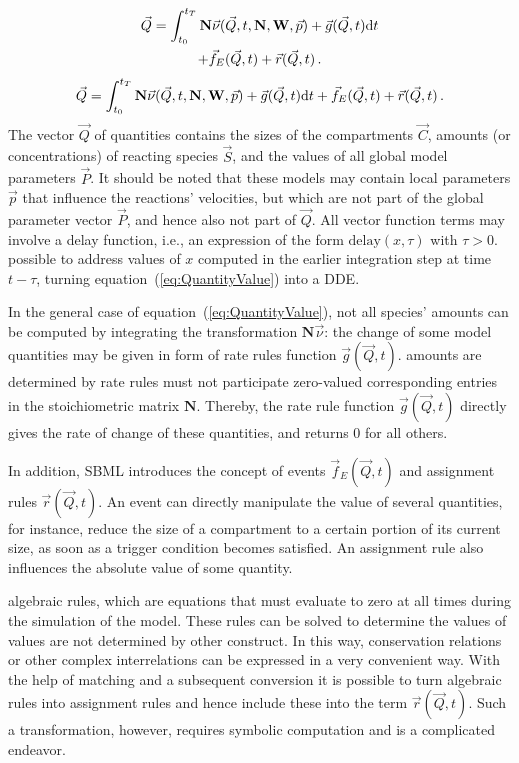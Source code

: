 \documentclass[10pt]{bmc_article}
\newenvironment{bmcformat}{\fussy\setboolean{publ}{true}}{\fussy}
\begin{document}
\begin{bmcformat}
{\begin{multline}
\vec{Q} = \int_{t_0}^{t_T} \mathbf{N}\vec{\nu}(\vec{Q}, t, \mathbf{N}, \mathbf{W},
\vec{p}) + \vec{g}(\vec{Q}, t)\mathrm{d} t\\ 
+ \vec{f}_E(\vec{Q}, t) + \vec{r}(\vec{Q}, t)\,.
\label{eq:QuantityValue}
\end{multline}}{\begin{equation}
\vec{Q} = \int_{t_0}^{t_T} \mathbf{N}\vec{\nu}(\vec{Q}, t, \mathbf{N}, \mathbf{W},
\vec{p}) + \vec{g}(\vec{Q}, t)\mathrm{d} t + \vec{f}_E(\vec{Q}, t) + \vec{r}(\vec{Q}, t)\,.
\label{eq:QuantityValue}
\end{equation}}
The vector $\vec{Q}$ of quantities contains the sizes of the
compartments $\vec{C}$, amounts (or concentrations) of reacting species
$\vec{S}$, and the values of all global model parameters $\vec{P}$.
It should be noted that these models may contain local parameters $\vec{p}$ that
influence the reactions' velocities, but which are not part of the global parameter
vector $\vec{P}$, and hence also not part of $\vec{Q}$.
All vector function terms may involve a delay function, i.e., an expression of 
the form $\mathrm{delay}(x, \tau)$ with $\tau > 0$. 
 possible to address values of $x$ computed in the earlier
integration step at time  $t - \tau$, turning equation~(\ref{eq:QuantityValue})
into a \acf{DDE}.

In the general case of equation~(\ref{eq:QuantityValue}), not all species' amounts
can be computed by integrating the transformation $\mathbf{N}\vec{\nu}$: the
change of some model quantities may be given in  form of rate rules 
function $\vec{g}(\vec{Q}, t)$.
 amounts are determined by rate rules must not participate  zero-valued corresponding entries in the
stoichiometric matrix $\mathbf{N}$.
Thereby, the rate rule function $\vec{g}(\vec{Q}, t)$ directly gives the rate of
change of these quantities, and returns 0 for all others.

In addition, \acs{SBML} introduces the concept of events $\vec{f}_E(\vec{Q}, t)$ and
assignment rules $\vec{r}(\vec{Q}, t)$.
An event can directly manipulate the value of several quantities, for instance,
reduce the size of a compartment to a certain portion of its current size,
as soon as a trigger condition becomes satisfied.
An assignment rule also influences the absolute value of some quantity.

 algebraic rules, which are equations that
must evaluate to zero at all times during the simulation of the model.
These rules can be solved to determine the values of  values
are not determined by  other construct.
In this way, conservation relations or other complex interrelations can be
expressed in a very convenient way.
With the help of  matching \cite{hopcroft1973n} and a subsequent conversion it is possible
to turn algebraic rules into assignment rules and hence include these into the
term $\vec{r}(\vec{Q}, t)$.
Such a transformation, however, requires symbolic computation and is
 a complicated endeavor.


\end{bmcformat}
\end{document}
